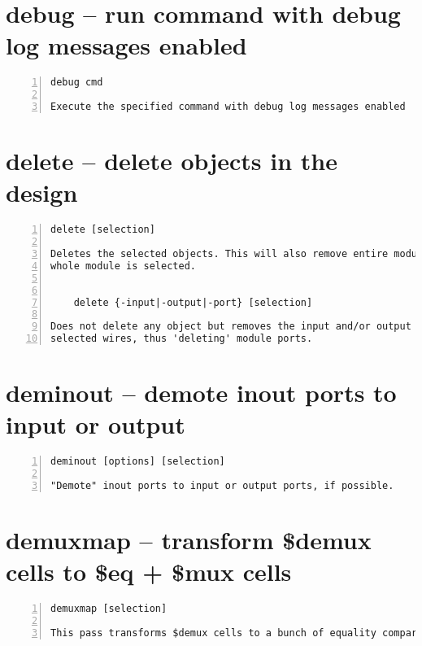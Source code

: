 \section{debug -- run command with debug log messages enabled}
\label{cmd:debug}
\begin{lstlisting}[numbers=left,frame=single]
    debug cmd

Execute the specified command with debug log messages enabled
\end{lstlisting}

\section{delete -- delete objects in the design}
\label{cmd:delete}
\begin{lstlisting}[numbers=left,frame=single]
    delete [selection]

Deletes the selected objects. This will also remove entire modules, if the
whole module is selected.


    delete {-input|-output|-port} [selection]

Does not delete any object but removes the input and/or output flag on the
selected wires, thus 'deleting' module ports.
\end{lstlisting}

\section{deminout -- demote inout ports to input or output}
\label{cmd:deminout}
\begin{lstlisting}[numbers=left,frame=single]
    deminout [options] [selection]

"Demote" inout ports to input or output ports, if possible.
\end{lstlisting}

\section{demuxmap -- transform \$demux cells to \$eq + \$mux cells}
\label{cmd:demuxmap}
\begin{lstlisting}[numbers=left,frame=single]
    demuxmap [selection]

This pass transforms $demux cells to a bunch of equality comparisons.
\end{lstlisting}

